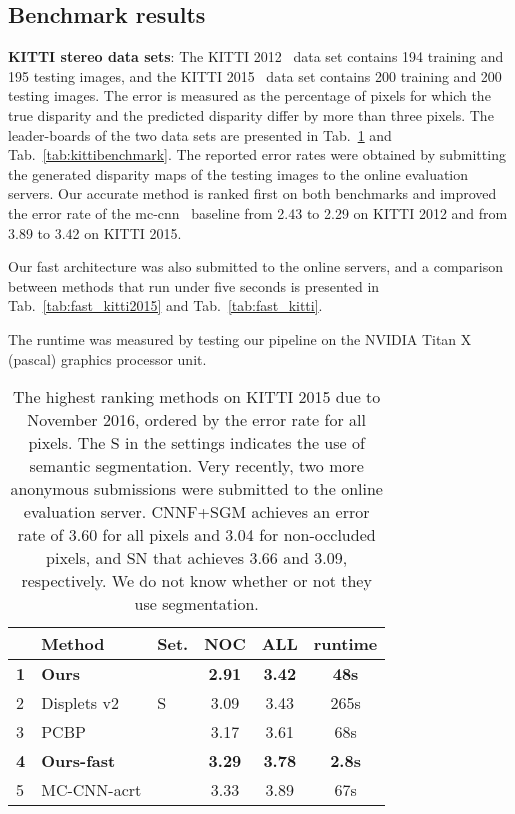 \documentclass[10pt, twocolumn, letterpaper]{article}
\begin{document}
\subsection{Benchmark results}
\textbf{KITTI stereo data sets}:
The KITTI 2012~\cite{kitti2012} data set contains 194 training and 195 testing images, and the KITTI 2015~\cite{kitti2015} data set contains 200 training and 200 testing images. The error is measured as the percentage of pixels for which the true disparity and the predicted disparity differ by more than three pixels. The leader-boards of the two data sets are presented in Tab.~\ref{tab:kitti2015benchmark} and Tab.~\ref{tab:kittibenchmark}. The reported error rates were obtained by submitting the generated disparity maps of the testing images to the online evaluation servers. Our accurate method is ranked first on both benchmarks and improved the error rate of the mc-cnn~\cite{newlecun} baseline from 2.43 to 2.29 on KITTI 2012 and from 3.89 to 3.42 on KITTI 2015.

Our fast architecture was also submitted to the online servers, and a comparison between methods that run under five seconds is presented in Tab.~\ref{tab:fast_kitti2015} and Tab.~\ref{tab:fast_kitti}.

The runtime was measured by testing our pipeline on the NVIDIA Titan X (pascal) graphics processor unit. 

\begin{table}[t]
\begin{center}
\begin{tabular}{|l l l c c c|}
\hline
		 	& Method 				& Set.	& NOC 		& ALL 		& runtime  \\ \hline
		\bf{1}	& \bf{Ours}  		&   		&\bf{2.91} 	&\bf{3.42} 	& \bf{48s} \\
        2 		& Displets v2\cite{displets} & S 	& 3.09 		& 3.43 	& 265s \\
        3 		& PCBP\cite{ntouskos2016confidence}  				& 		& 3.17 		& 3.61 	& 68s \\
        \bf{4} & \bf{Ours-fast} & & \bf{3.29} & \bf{3.78} & \bf{2.8s} \\
        5 		& MC-CNN-acrt\cite{newlecun} 			& 		& 3.33 		& 3.89 	& 67s \\		
\hline
\end{tabular}
\end{center}
\caption{The highest ranking methods on KITTI 2015 due to November 2016, ordered by the error rate for all pixels. The S in the settings indicates the use of semantic segmentation. Very recently, two more anonymous submissions were submitted to the online evaluation server. CNNF+SGM achieves an error rate of 3.60 for all pixels and 3.04 for non-occluded pixels, and SN that achieves 3.66 and 3.09, respectively. We do not know whether or not they use segmentation.}
\label{tab:kitti2015benchmark}
\end{table}
\end{document}
